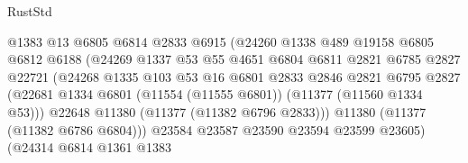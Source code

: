 \begin{lexlean}{RustStd}
\begin{coremodule}
                                    @1383
                                    @13
                                    @6805
                                    @6814
                                    @2833
                                    @6915
                                    (@24260
                                      @1338
                                      @489
                                      @19158
                                      @6805
                                      @6812
                                      @6188
                                      (@24269
                                        @1337
                                        @53
                                        @55
                                        @4651
                                        @6804
                                        @6811
                                        @2821
                                        @6785
                                        @2827
                                        @22721
                                        (@24268
                                          @1335
                                          @103
                                          @53
                                          @16
                                          @6801
                                          @2833
                                          @2846
                                          @2821
                                          @6795
                                          @2827
                                          (@22681
                                            @1334
                                            @6801
                                            (@11554 (@11555 @6801))
                                            (@11377 (@11560 @1334 @53)))
                                          @22648
                                          @11380
                                          (@11377 (@11382 @6796 @2833)))
                                        @11380
                                        (@11377 (@11382 @6786 @6804)))
                                      @23584
                                      @23587
                                      @23590
                                      @23594
                                      @23599
                                      @23605)
                                    (@24314
                                      @6814
                                      @1361
                                      @1383

\end{coremodule}
\end{lexlean}
